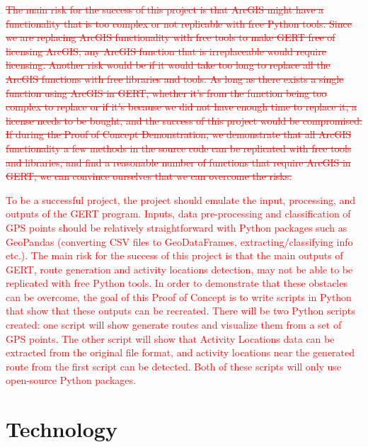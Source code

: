 \documentclass{article}
\begin{document}
\textcolor{red}{\sout{The main risk for the success of this project is that ArcGIS might have a functionality that is too complex or not replicable with free Python tools. Since we are replacing ArcGIS functionality with free tools to make GERT free of licensing ArcGIS, any ArcGIS function that is irreplaceable would require licensing. Another risk would be if it would take too long to replace all the ArcGIS functions with free libraries and tools. As long as there exists a single function using ArcGIS in GERT, whether it's from the function being too complex to replace or if it's because we did not have enough time to replace it, a license needs to be bought, and the success of this project would be compromised. If during the Proof of Concept Demonstration, we demonstrate that \textcolor{red}{\sout{all ArcGIS functionality}} \textcolor{red}{a few methods in the source code} can be replicated with free tools and libraries, and find a reasonable number of functions that require ArcGIS in GERT, we can convince ourselves that we can overcome the risks.}}

\textcolor{red}{To be a successful project, the project should emulate the input, processing, and outputs of the GERT program. Inputs, data pre-processing and classification of GPS points should be relatively straightforward with Python packages such as GeoPandas (converting CSV files to GeoDataFrames, extracting/classifying info etc.). The main risk for the success of this project is that the main outputs of GERT, route generation and activity locations detection, may not be able to be replicated with free Python tools. In order to demonstrate that these obstacles can be overcome, the goal of this Proof of Concept is to write scripts in Python that show that these outputs can be recreated. There will be two Python scripts created: one script will show generate routes and visualize them from a set of GPS points. The other script will show that Activity Locations data can be extracted from the original file format, and activity locations near the generated route from the first script can be detected. Both of these scripts will only use open-source Python packages.
}

\section{Technology}
\end{document}
